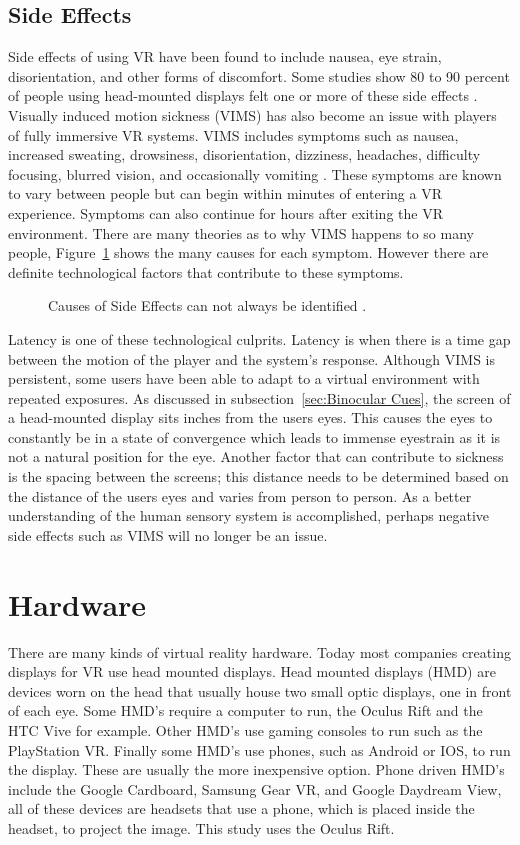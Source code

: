 \subsection{Side Effects}
Side effects of using VR have been found to include nausea, eye strain, disorientation, and other forms of discomfort. Some studies show 80 to 90 percent of people using head-mounted displays felt one or more of these side effects \cite{JIS2}. Visually induced motion sickness (VIMS) has also become an issue with players of fully immersive VR systems. VIMS includes symptoms such as nausea, increased sweating, drowsiness, disorientation, dizziness, headaches, difficulty focusing, blurred vision, and occasionally vomiting \cite{JIS2}. These symptoms are known to vary between people but can begin within minutes of entering a VR experience. Symptoms can also continue for hours after exiting the VR environment. There are many theories as to why VIMS happens to so many people, Figure~\ref{fig:sickness} shows the many causes for each symptom. However there are definite technological factors that contribute to these symptoms.  
\begin{figure}[!ht]
	\begin{center}
	\end{center}
	\caption{Causes of Side Effects can not always be identified \cite{LaValle2017}.} \label{fig:sickness}
\end{figure}Latency is one of these technological culprits. Latency is when there is a time gap between the motion of the player and the system's response. Although VIMS is persistent, some users have been able to adapt to a virtual environment with repeated exposures. As discussed in subsection~\ref{sec:Binocular Cues}, the screen of a head-mounted display sits inches from the users eyes. This causes the eyes to constantly be in a state of convergence which leads to immense eyestrain as it is not a natural position for the eye. Another factor that can contribute to sickness is the spacing between the screens; this distance needs to be determined based on the distance of the users eyes and varies from person to person. As a better understanding of the human sensory system is accomplished, perhaps negative side effects such as VIMS will no longer be an issue.


\section{Hardware}
There are many kinds of virtual reality hardware. Today most companies creating displays for VR use head mounted displays. Head mounted displays (HMD) are devices worn on the head that usually house two small optic displays, one in front of each eye. Some HMD's require a computer to run, the Oculus Rift and the HTC Vive for example. Other HMD's use gaming consoles to run such as the PlayStation VR. Finally some HMD's use phones, such as Android or IOS, to run the display. These are usually the more inexpensive option. Phone driven HMD's include the Google Cardboard, Samsung Gear VR, and Google Daydream View, all of these devices are headsets that use a phone, which is placed inside the headset, to project the image. This study uses the Oculus Rift. 


